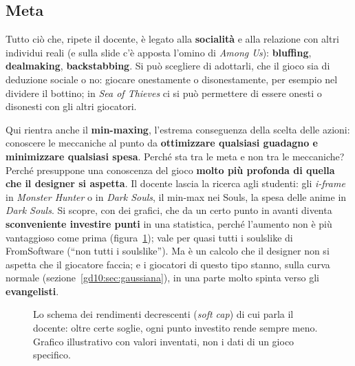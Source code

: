 \subsection{Meta}

Tutto ciò che, ripete il docente, è legato alla \textbf{socialità} e alla
relazione con altri individui reali (e sulla slide c'è apposta l'omino di
\emph{Among Us}): \textbf{bluffing}, \textbf{dealmaking},
\textbf{backstabbing}. Si può scegliere di adottarli, che il gioco sia di
deduzione sociale o no: giocare onestamente o disonestamente, per esempio
nel dividere il bottino; in \emph{Sea of Thieves} ci si può permettere di
essere onesti o disonesti con gli altri giocatori.

Qui rientra anche il \textbf{min-maxing}, l'estrema conseguenza della scelta
delle azioni: conoscere le meccaniche al punto da \textbf{ottimizzare
qualsiasi guadagno e minimizzare qualsiasi spesa}. Perché sta tra le meta e
non tra le meccaniche? Perché presuppone una conoscenza del gioco
\textbf{molto più profonda di quella che il designer si aspetta}. Il docente
lascia la ricerca agli studenti: gli \emph{i-frame} in \emph{Monster Hunter}
o in \emph{Dark Souls}, il min-max nei Souls, la spesa delle anime in
\emph{Dark Souls}. Si scopre, con dei grafici, che da un certo punto in
avanti diventa \textbf{sconveniente investire punti} in una statistica,
perché l'aumento non è più vantaggioso come prima
(figura~\ref{gd15:fig:softcap}); vale per quasi tutti i soulslike di
FromSoftware (``non tutti i soulslike''). Ma è un calcolo che il designer non
si aspetta che il giocatore faccia; e i giocatori di questo tipo stanno, sulla
curva normale (sezione~\ref{gd10:sec:gaussiana}), in una parte molto spinta
verso gli \textbf{evangelisti}.

\begin{figure}[htbp]
  \centering
  \caption{Lo schema dei rendimenti decrescenti (\emph{soft cap}) di cui
  parla il docente: oltre certe soglie, ogni punto investito rende sempre
  meno. Grafico illustrativo con valori inventati, non i dati di un gioco
  specifico.}
  \label{gd15:fig:softcap}
\end{figure}

